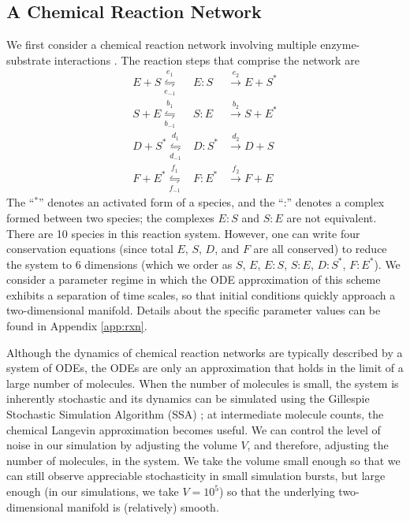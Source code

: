 \subsection{A Chemical Reaction Network}\label{subsec:rxn_network}

We first consider a chemical reaction network involving  multiple enzyme-substrate interactions \cite{zagaris2012stability}.
%
The reaction steps that comprise the network are\\
\begin{equation}
\begin{array}{rcl}
E + S \overset{e_1}{\underset{e_{-1}}{\leftrightharpoons}} & E:S & \overset{e_2}{\rightarrow} E + S^{*} \\
S + E \overset{b_1}{\underset{b_{-1}}{\leftrightharpoons}} & S:E & \overset{b_2}{\rightarrow} S + E^{*}\\
D + S^{*} \overset{d_1}{\underset{d_{-1}}{\leftrightharpoons}} & D:S^{*} & \overset{d_2}{\rightarrow} D + S\\
F + E^{*} \overset{f_1}{\underset{f_{-1}}{\leftrightharpoons}} & F:E^{*} & \overset{f_2}{\rightarrow} F + E
\end{array}
\end{equation}
The ``$^{*}$'' denotes an activated form of a species, and the ``:'' denotes a complex formed between two species; the complexes $E:S$ and $S:E$ are not equivalent.
%
There are 10 species in this reaction system.
%
However, one can write four conservation equations (since total $E$, $S$, $D$, and $F$ are all conserved) to reduce the system to 6 dimensions
(which we order as $S$, $E$, $E:S$, $S:E$, $D:S^{*}$, $F:E^{*}$).
%
We consider a parameter regime in which the ODE approximation of this scheme exhibits a separation of time scales, so that initial conditions quickly approach a two-dimensional manifold.
%
Details about the specific parameter values can be found in Appendix \ref{app:rxn}.

Although the dynamics of chemical reaction networks are typically described by a system of ODEs, the ODEs are only an approximation that holds
in the limit of a large number of molecules.
%
When the number of molecules is small, the system is inherently stochastic and its dynamics can be simulated using the
Gillespie Stochastic Simulation Algorithm (SSA) \cite{gillespie1977exact}; at intermediate molecule counts, the chemical Langevin approximation \cite{gillespie2000chemical}
becomes useful.
%
We can control the level of noise in our simulation by adjusting the volume $V$, and therefore, adjusting the number of molecules, in the system.
%
We take the volume small enough so that we can still observe appreciable stochasticity in small simulation bursts, but large enough (in our simulations, we take $V=10^5$) so that the underlying two-dimensional manifold is (relatively) smooth.

